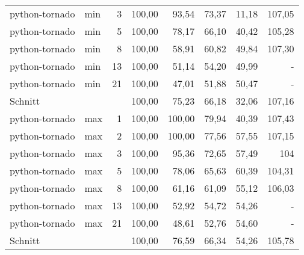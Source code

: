 \begin{footnotesize}
\begin{longtable}{llrrrrrr}
		{\scriptsize python-tornado} & min     & 3          & 100,00 & 93,54                       & 73,37                          & 11,18  & 107,05 \\
		{\scriptsize python-tornado} & min     & 5          & 100,00 & 78,17                       & 66,10                          & 40,42  & 105,28 \\
		{\scriptsize python-tornado} & min     & 8          & 100,00 & 58,91                       & 60,82                          & 49,84  & 107,30 \\
		{\scriptsize python-tornado} & min     & 13         & 100,00 & 51,14                       & 54,20                          & 49,99  & -      \\
		{\scriptsize python-tornado} & min     & 21         & 100,00 & 47,01                       & 51,88                          & 50,47  & -      \\ \hline
		Schnitt        &         &            & 100,00 & 75,23                       & 66,18                          & 32,06  & 107,16 \\ \hline
		{\scriptsize python-tornado} & max     & 1          & 100,00 & \cellcolor[HTML]{C0C0C0}100,00 & 79,94                          & 40,39  & 107,43 \\
		{\scriptsize python-tornado} & max     & 2          & 100,00 & \cellcolor[HTML]{C0C0C0}100,00 & 77,56                          & 57,55  & 107,15 \\
		{\scriptsize python-tornado} & max     & 3          & 100,00 & 95,36                       & 72,65                          & 57,49  & 104    \\
		{\scriptsize python-tornado} & max     & 5          & 100,00 & 78,06                       & 65,63                          & 60,39  & 104,31 \\
		{\scriptsize python-tornado} & max     & 8          & 100,00 & 61,16                       & 61,09                          & 55,12  & 106,03 \\
		{\scriptsize python-tornado} & max     & 13         & 100,00 & 52,92                       & 54,72                          & 54,26  & -      \\
		{\scriptsize python-tornado} & max     & 21         & 100,00 & 48,61                       & 52,76                          & 54,60  & -      \\ \hline
		Schnitt        &         &            & 100,00 & 76,59                       & 66,34                          & 54,26  & 105,78 \\ \hline

\end{longtable}
\end{footnotesize}
